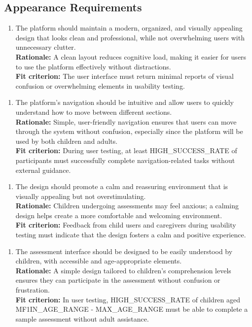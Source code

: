 \documentclass[12pt]{article}
\begin{document}
\subsection{Appearance Requirements}
\begin{enumerate}[label={LF-AR}1. ]
  \item The platform should maintain a modern, organized, and visually appealing design that looks clean and professional, while not 
  overwhelming users with unnecessary clutter.\\
  \textbf{Rationale: }A clean layout reduces cognitive load, making it easier for users to use the platform effectively without distractions.\\
  \textbf{Fit criterion: }The user interface must return minimal reports of visual confusion or overwhelming elements in usability testing.  
\end{enumerate}
\begin{enumerate}[label={LF-AR}2. ]
  \item The platform’s navigation should be intuitive and allow users to quickly understand how to move between different sections.\\
  \textbf{Rationale: }Simple, user-friendly navigation ensures that users can move through the system without confusion, especially since the platform will be used by both children and adults.\\
  \textbf{Fit criterion: }During user testing, at least HIGH\_SUCCESS\_RATE of participants must successfully complete navigation-related tasks without external guidance.  
\end{enumerate}
\begin{enumerate}[label={LF-AR}3. ]
  \item The design should promote a calm and reassuring environment that is visually appealing but not overstimulating.\\
  \textbf{Rationale: }Children undergoing assessments may feel anxious; a calming design helps create a more comfortable and welcoming environment.\\
  \textbf{Fit criterion: }Feedback from child users and caregivers during usability testing must indicate that the design fosters a calm and positive experience.  
\end{enumerate}
\begin{enumerate}[label={LF-AR}4. ]
  \item The assessment interface should be designed to be easily understood by children, with accessible and age-appropriate elements.\\
  \textbf{Rationale: }A simple design tailored to children’s comprehension levels ensures they can participate in the assessment without confusion or frustration.\\
  \textbf{Fit criterion: }In user testing, HIGH\_SUCCESS\_RATE of children aged MF1IN\_AGE\_RANGE - MAX\_AGE\_RANGE must be able to complete a sample assessment without adult assistance.  
\end{enumerate}
\end{document}
